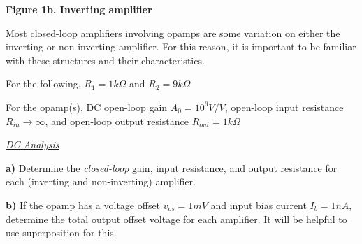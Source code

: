 \documentclass[11pt, letterpaper]{article}
\begin{document}
\begin{center}
    
    \vspace{0.5em}
    \textbf{Figure 1b. Inverting amplifier}
\end{center}

\vspace{1em}

Most closed-loop amplifiers involving opamps are some variation on either the inverting or non-inverting amplifier. For this reason, it is important to be familiar with these structures and their characteristics.

For the following, $R_1 = 1k\Omega$ and $R_2 = 9k\Omega$

For the opamp(s), DC open-loop gain $A_0 = 10^6 V/V$, open-loop input resistance $R_{in} \rightarrow \infty$, and open-loop output resistance $R_{out} = 1k\Omega$

\underline{\textit{DC Analysis}}

\textbf{a)} Determine the \textit{closed-loop} gain, input resistance, and output resistance for each (inverting and non-inverting) amplifier.

\textbf{b)} If the opamp has a voltage offset $v_{os} = 1mV$ and input bias current $I_b = 1nA$, determine the total output offset voltage for each amplifier. It will be helpful to use superposition for this.
\end{document}
